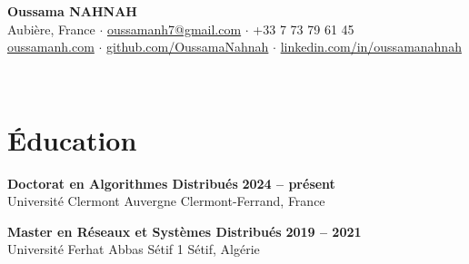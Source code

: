 \documentclass[a4paper,10pt]{article}
\begin{document}
\noindent
\begin{minipage}[c]{\dimexpr\textwidth - 1.8cm\relax}
    {\huge \textbf{\textcolor{primary}{Oussama NAHNAH}}}\\[4pt]
    \textcolor{textgray}{
        Aubière, France \enspace$\cdot$\enspace
        \href{mailto:oussamanh7@gmail.com}{oussamanh7@gmail.com} \enspace$\cdot$\enspace
        +33 7 73 79 61 45\\[2pt]
        \href{https://oussamanh.com}{oussamanh.com} \enspace$\cdot$\enspace
        \href{https://github.com/OussamaNahnah}{github.com/OussamaNahnah} \enspace$\cdot$\enspace
        \href{https://www.linkedin.com/in/oussamanahnah/}{linkedin.com/in/oussamanahnah}
    }
\end{minipage}\hfill
\begin{minipage}[c]{1.5cm}
    \raggedleft
    \\[2pt]
\end{minipage}
\vspace{6pt}

\vspace{4pt}

\section{Éducation}

\textbf{Doctorat en Algorithmes Distribués} \hfill \textbf{2024 -- présent}\\
\textcolor{textgray}{Université Clermont Auvergne \hfill Clermont-Ferrand, France}

\vspace{3pt}

\textbf{Master en Réseaux et Systèmes Distribués} \hfill \textbf{2019 -- 2021}\\
\textcolor{textgray}{Université Ferhat Abbas Sétif 1 \hfill Sétif, Algérie}
\end{document}
